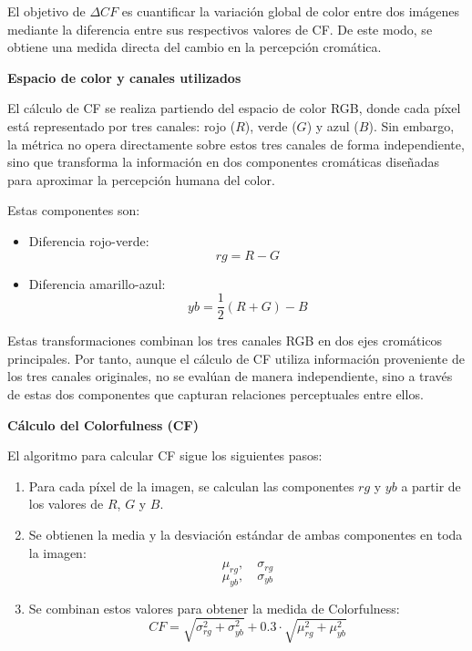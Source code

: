 \documentclass[a4paper]{article}
\begin{document}
El objetivo de $\Delta CF$ es cuantificar la variación global de color entre dos imágenes mediante la diferencia entre sus respectivos valores de CF. De este modo, se obtiene una medida directa del cambio en la percepción cromática.

\medskip
\textbf{Espacio de color y canales utilizados}

El cálculo de CF se realiza partiendo del espacio de color RGB, donde cada píxel está representado por tres canales: rojo ($R$), verde ($G$) y azul ($B$). Sin embargo, la métrica no opera directamente sobre estos tres canales de forma independiente, sino que transforma la información en dos componentes cromáticas diseñadas para aproximar la percepción humana del color.

Estas componentes son:

\begin{itemize}
	\item Diferencia rojo-verde:
	\begin{equation}
		rg = R - G
	\end{equation}
	
	\item Diferencia amarillo-azul:
	\begin{equation}
		yb = \frac{1}{2}(R + G) - B
	\end{equation}
\end{itemize}

Estas transformaciones combinan los tres canales RGB en dos ejes cromáticos principales. Por tanto, aunque el cálculo de CF utiliza información proveniente de los tres canales originales, no se evalúan de manera independiente, sino a través de estas dos componentes que capturan relaciones perceptuales entre ellos.

\medskip
\textbf{Cálculo del Colorfulness (CF)}

El algoritmo para calcular CF sigue los siguientes pasos:

\begin{enumerate}
	\item Para cada píxel de la imagen, se calculan las componentes $rg$ y $yb$ a partir de los valores de $R$, $G$ y $B$.
	
	\item Se obtienen la media y la desviación estándar de ambas componentes en toda la imagen:
	\begin{equation}
		\mu_{rg}, \quad \sigma_{rg}
	\end{equation}
	\begin{equation}
		\mu_{yb}, \quad \sigma_{yb}
	\end{equation}
	
	\item Se combinan estos valores para obtener la medida de Colorfulness:
	\begin{equation}
		CF = \sqrt{\sigma_{rg}^2 + \sigma_{yb}^2} + 0.3 \cdot \sqrt{\mu_{rg}^2 + \mu_{yb}^2}
	\end{equation}
\end{enumerate}
\end{document}
